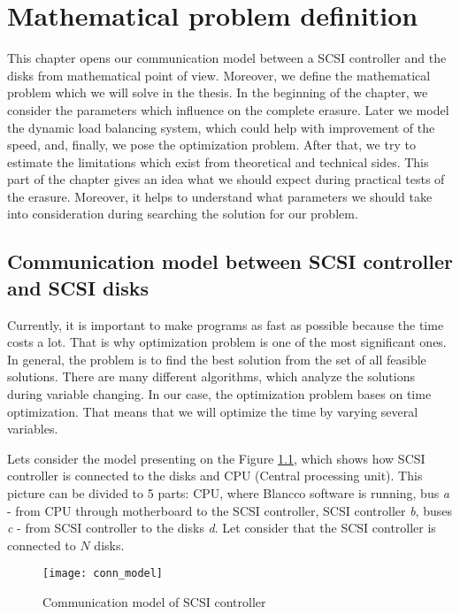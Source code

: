 \chapter{Mathematical problem definition}
\label{chap3:title}

This chapter opens our communication model between a SCSI controller and the disks from mathematical point of view. Moreover, we define the mathematical problem which we will solve in the thesis. In the beginning of the chapter, we consider the parameters which influence on the complete erasure. Later we model the dynamic load balancing system, which could help with improvement of the speed, and, finally, we pose the optimization problem. After that, we try to estimate the limitations which exist from theoretical and technical sides. This part of the chapter gives an idea what we should expect during practical tests of the erasure. Moreover, it helps to understand what parameters we should take into consideration during searching the solution for our problem.

\newpage
\section{Communication model between SCSI controller and SCSI disks}
Currently, it is important to make programs as fast as possible because the time costs a lot. That is why optimization problem is one of the most significant ones. In general, the problem is to find the best solution from the set of all feasible solutions. There are many different algorithms, which analyze the solutions during variable changing. In our case, the optimization problem bases on time optimization. That means that we will optimize the time by varying several variables.

Lets consider the model presenting on the Figure \ref{fig:conn_model}, which shows how SCSI controller is connected to the disks and CPU (Central processing unit). This picture can be divided to 5 parts: CPU, where Blancco software is running, bus \emph{a} - from CPU through motherboard to the SCSI controller, SCSI controller \emph{b}, buses \emph{c} - from SCSI controller to the disks \emph{d}. Let consider that the SCSI controller is connected to $N$ disks.

\begin{figure}[h]
\begin{center}
  \texttt{[image: conn\_model]}
\end{center}
  \caption{Communication model of SCSI controller}
  \label{fig:conn_model}
\end{figure}


